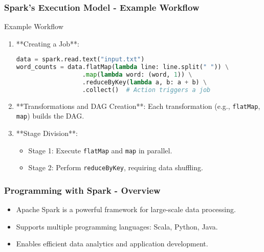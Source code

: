 \documentclass[aspectratio=169]{beamer}
\begin{document}
\begin{frame}[fragile]
    \frametitle{Spark's Execution Model - Example Workflow}
    \begin{block}{Example Workflow}
        \begin{enumerate}
            \item **Creating a Job**:
            \begin{lstlisting}[language=Python]
data = spark.read.text("input.txt")
word_counts = data.flatMap(lambda line: line.split(" ")) \
                  .map(lambda word: (word, 1)) \
                  .reduceByKey(lambda a, b: a + b) \
                  .collect()  # Action triggers a job
            \end{lstlisting}

            \item **Transformations and DAG Creation**: Each transformation (e.g., \texttt{flatMap}, \texttt{map}) builds the DAG.
            
            \item **Stage Division**:
            \begin{itemize}
                \item Stage 1: Execute \texttt{flatMap} and \texttt{map} in parallel.
                \item Stage 2: Perform \texttt{reduceByKey}, requiring data shuffling.
            \end{itemize}
        \end{enumerate}
    \end{block}
\end{frame}

\begin{frame}[fragile]
    \frametitle{Programming with Spark - Overview}
    \begin{itemize}
        \item Apache Spark is a powerful framework for large-scale data processing.
        \item Supports multiple programming languages: Scala, Python, Java.
        \item Enables efficient data analytics and application development.
    \end{itemize}
\end{frame}
\end{document}
